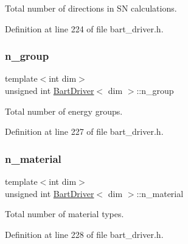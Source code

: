 Total number of directions in SN calculations. 



Definition at line 224 of file bart\+\_\+driver.\+h.

\mbox{\label{class_bart_driver_aeb5a04392c80b32379b02e18acbc1126}} 
\subsubsection{\texorpdfstring{n\+\_\+group}{n\_group}}
{\footnotesize\ttfamily template$<$int dim$>$ \\
unsigned int \hyperlink{class_bart_driver}{Bart\+Driver}$<$ dim $>$\+::n\+\_\+group\hspace{0.3cm}{\ttfamily [private]}}



Total number of energy groups. 



Definition at line 227 of file bart\+\_\+driver.\+h.

\mbox{\label{class_bart_driver_ae6c9141662b95c89b674ccdc04e9233f}} 
\subsubsection{\texorpdfstring{n\+\_\+material}{n\_material}}
{\footnotesize\ttfamily template$<$int dim$>$ \\
unsigned int \hyperlink{class_bart_driver}{Bart\+Driver}$<$ dim $>$\+::n\+\_\+material\hspace{0.3cm}{\ttfamily [private]}}



Total number of material types. 



Definition at line 228 of file bart\+\_\+driver.\+h.

\mbox{\label{class_bart_driver_ab290f0bd63869bf124163f68e1be1a6a}} 
